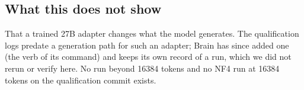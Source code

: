 \subsection{What this does not show}

That a trained 27B adapter changes what the model generates. The qualification logs predate
a generation path for such an adapter; Brain has since added one (the 
verb of its  command) and keeps its own record of a run, which we did
not rerun or verify here. No run beyond 16384 tokens and no NF4 run at 16384 tokens on the
qualification commit exists.
